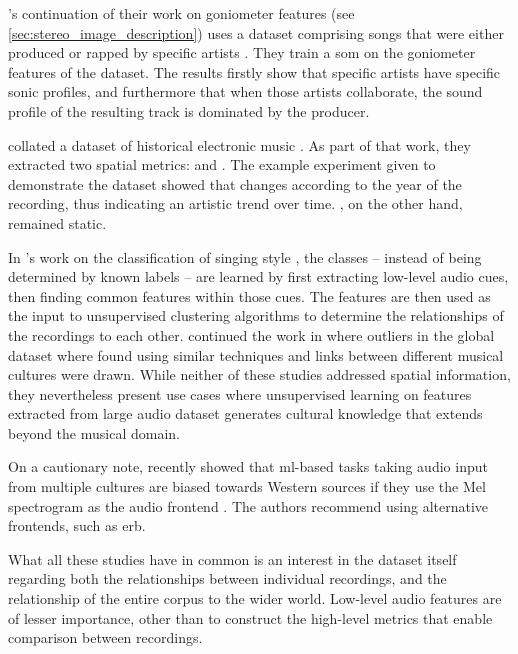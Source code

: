 \citeauthor{ziemerProducerVsRapper2025}'s continuation of their work on goniometer features (see \cref{sec:stereo_image_description}) uses a dataset comprising songs that were either produced or rapped by specific artists \cite{ziemerProducerVsRapper2025}. They train a \gls{som} on the goniometer features of the dataset. The results firstly show that specific artists have specific sonic profiles, and furthermore that when those artists collaborate, the sound profile of the resulting track is dominated by the producer.

\citeauthor{collinsNewCuratedCorpus2018} collated a dataset of historical electronic music \cite{collinsNewCuratedCorpus2018}. As part of that work, they extracted two spatial metrics:  and . The example experiment given to demonstrate the dataset showed that  changes according to the year of the recording, thus indicating an artistic trend over time. , on the other hand, remained static.

In \citeauthor{panteliCharacterizationSingingStyles2017}'s work on the classification of singing style \cite{panteliCharacterizationSingingStyles2017}, the classes -- instead of being determined by known labels -- are learned by first extracting low-level audio cues, then finding common features within those cues. The features are then used as the input to unsupervised clustering algorithms to determine the relationships of the recordings to each other. \citeauthor{panteliComputationalStudyOutliers2017} continued the work in \cite{panteliComputationalStudyOutliers2017} where outliers in the global dataset where found using similar techniques and links between different musical cultures were drawn. While neither of these studies addressed spatial information, they nevertheless present use cases where unsupervised learning on features extracted from large audio dataset generates cultural knowledge that extends beyond the musical domain. 

On a cautionary note, \citeauthor{chauhanCrossCulturalBiasMelScale2026} recently showed that \gls{ml}-based tasks taking audio input from multiple cultures are biased towards Western sources if they use the Mel spectrogram as the audio frontend \cite{chauhanCrossCulturalBiasMelScale2026}. The authors recommend using alternative frontends, such as \gls{erb}.

What all these studies have in common is an interest in the dataset itself regarding both the relationships between individual recordings, and the relationship of the entire corpus to the wider world. Low-level audio features are of lesser importance, other than to construct the high-level metrics that enable comparison between recordings.

